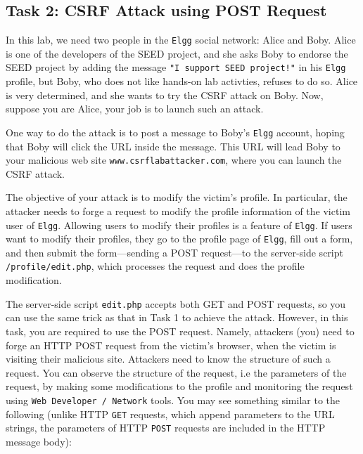 \subsection{Task 2: CSRF Attack using POST Request}

In this lab, we need two people in the {\tt Elgg} social network: Alice and Boby. Alice is
one of the developers of the SEED project, and she asks Boby to 
endorse the SEED project by adding the message
{\tt "I support SEED project!"} in his {\tt Elgg} profile, but   
Boby, who does not like hands-on lab activties, refuses to do so.  
Alice is very determined, and she wants to try the CSRF attack on Boby. 
Now, suppose you are Alice, your job is to launch such an attack. 

One way to do the attack is to post a message to Boby's {\tt Elgg} account, hoping that 
Boby will click the URL inside the message. This URL will lead Boby to your
malicious web site {\tt www.csrflabattacker.com}, where you can launch the
CSRF attack. 

The objective of your attack is to modify the victim's profile. 
In particular, the attacker needs to forge a request 
to modify the profile information of the victim user of {\tt Elgg}. 
Allowing users to modify their profiles is a feature of 
{\tt Elgg}. If  users want to modify their profiles,
they go to the profile page of {\tt Elgg}, fill out 
a form, and then submit the form---sending a POST request---to 
the server-side script {\tt /profile/edit.php}, which 
processes the request and does the profile modification.


The server-side script {\tt edit.php} accepts both GET and POST requests,
so you can use the same trick as that in Task 1 to achieve the attack.
However, in this task, you are required to use the POST request. 
Namely, attackers (you) need to forge an HTTP POST request from the victim's
browser, when the victim is visiting their malicious site. 
Attackers need to know the structure of such a request.
You can observe the
structure of the request, i.e the parameters of the request, by making
some modifications to the profile and monitoring the request using
\texttt{Web Developer / Network} tools. You may see something similar to
the following (unlike HTTP {\tt GET} requests, which append 
parameters to the URL strings, the parameters of HTTP {\tt POST} requests are 
included in the HTTP message body): 


